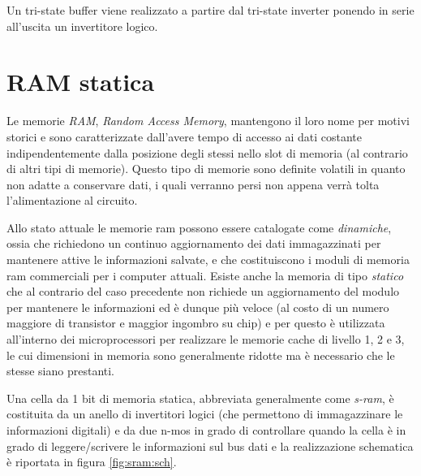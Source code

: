 	Un tri-state buffer viene realizzato a partire dal tri-state inverter ponendo in serie all'uscita un invertitore logico.
	
	
\section{RAM statica}
	Le memorie \textit{RAM}, \textit{Random Access Memory}, mantengono il loro nome per motivi storici e sono caratterizzate dall'avere tempo di accesso ai dati costante indipendentemente dalla posizione degli stessi nello slot di memoria (al contrario di altri tipi di memorie). Questo tipo di memorie sono definite volatili in quanto non adatte a conservare dati, i quali verranno persi non appena verrà tolta l'alimentazione al circuito.
	
	Allo stato attuale le memorie ram possono essere catalogate come \textit{dinamiche}, ossia che richiedono un continuo aggiornamento dei dati immagazzinati per mantenere attive le informazioni salvate, e che costituiscono i moduli di memoria ram commerciali per i computer attuali. Esiste anche la memoria di tipo \textit{statico} che al contrario del caso precedente non richiede un aggiornamento del modulo per mantenere le informazioni ed è dunque più veloce (al costo di un numero maggiore di transistor e maggior ingombro su chip) e per questo è utilizzata all'interno dei microprocessori per realizzare le memorie cache di livello 1, 2 e 3, le cui dimensioni in memoria sono generalmente ridotte ma è necessario che le stesse siano prestanti.
	
	\vspace{5mm}
	
	Una cella da 1 bit di memoria statica, abbreviata generalmente come \textit{s-ram}, è costituita da un anello di invertitori logici (che permettono di immagazzinare le informazioni digitali) e da due n-mos in grado di controllare quando la cella è in grado di leggere/scrivere le informazioni sul bus dati e la realizzazione schematica è riportata in figura \ref{fig:sram:sch}.
	
